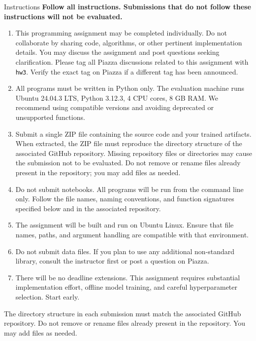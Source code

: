 \documentclass[10pt]{article}
\begin{document}
\begin{exbox}{Instructions}
\textbf{\large Follow all instructions. Submissions that do not follow these instructions will not be evaluated.}

{\small
\begin{enumerate}
  \item This programming assignment may be completed individually. Do not collaborate by sharing code, algorithms, or other pertinent implementation details. You may discuss the assignment and post questions seeking clarification. Please tag all Piazza discussions related to this assignment with \texttt{hw3}. Verify the exact tag on Piazza if a different tag has been announced.

  \item All programs must be written in Python  only. The evaluation machine runs Ubuntu 24.04.3 LTS, Python 3.12.3, 4 CPU cores, 8 GB RAM. We recommend using compatible versions and avoiding deprecated or unsupported functions.

  \item Submit a single ZIP file containing the source code and your trained artifacts. When extracted, the ZIP file must reproduce the directory structure of the associated GitHub repository. Missing repository files or directories may cause the submission not to be evaluated. Do not remove or rename files already present in the repository; you may add files as needed.

  \item Do not submit notebooks. All programs will be run from the command line only. Follow the file names, naming conventions, and function signatures specified below and in the associated repository.

  \item The assignment will be built and run on Ubuntu Linux. Ensure that file names, paths, and argument handling are compatible with that environment.

  \item Do not submit data files. If you plan to use any additional non-standard library, consult the instructor first or post a question on Piazza.

  \item There will be no deadline extensions. This assignment requires substantial implementation effort, offline model training, and careful hyperparameter selection. Start early.
\end{enumerate}
}

The directory structure in each submission must match the associated GitHub repository. Do not remove or rename files already present in the repository. You may add files as needed.
\end{exbox}
\end{document}
